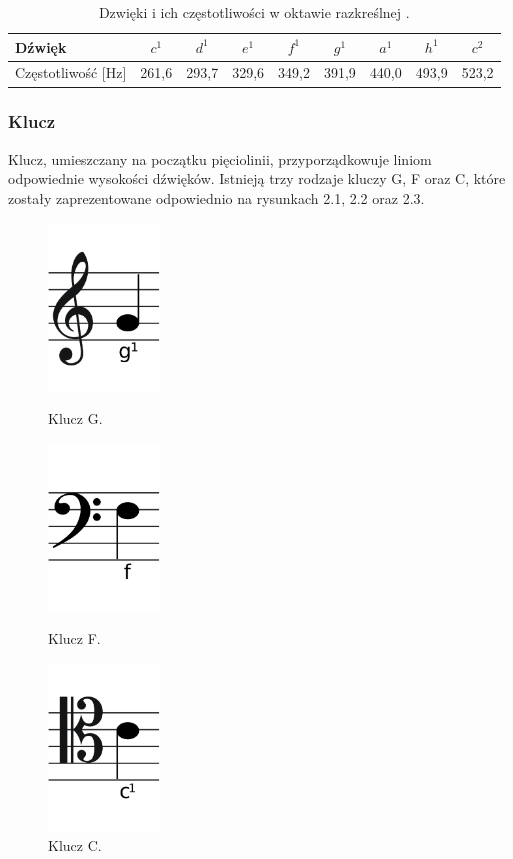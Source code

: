 \documentclass[printmode, eng, openany]{mgr}
\newcommand\tab[1][1cm]{\hspace*{#1}}
\begin{document}
\begin{table}[!htb]
\centering
\caption{Dzwięki i ich częstotliwości w oktawie razkreślnej \cite{tab}.}
\begin{tabular}{|l|c|c|c|c|c|c|c|c|}
\hline
Dźwięk & $c^{1}$ & $d^{1}$ & $e^{1}$ & $f^{1}$ & $g^{1}$ & $a^{1}$ & $h^{1}$ & $c^{2}$  \\
\hline
Częstotliwość [Hz] & 261,6 & 293,7 & 329,6 & 349,2 & 391,9 & 440,0 & 493,9 & 523,2 \\
\hline
\end{tabular}
\end{table}
\subsubsection{Klucz}
\tab Klucz, umieszczany na początku pięciolinii, przyporządkowuje liniom odpowiednie wysokości dźwięków. Istnieją trzy rodzaje kluczy G, F oraz C, które zostały zaprezentowane odpowiednio na rysunkach 2.1, 2.2 oraz 2.3.

\begin{figure}[!htb]
\begin{minipage}{0.31\textwidth}
\centering
\includegraphics[width=3cm]{G}
\caption{Klucz G.}
\end{minipage}
\begin{minipage}{0.31\textwidth}
\centering
\includegraphics[width=3cm]{F}
\caption{Klucz F.}
\end{minipage}
\begin{minipage}{0.31\textwidth}
\centering
\includegraphics[width=3cm]{C}
\caption{Klucz C.}
\end{minipage}
\end{figure}
\end{document}
